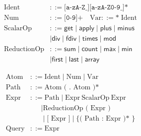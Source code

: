 \documentclass[runningheads]{llncs}
\begin{document}
\begin{figure}[t!]
\scriptsize

\begin{minipage}{0.5\textwidth}
\begin{align*}
\text{Ident} &::= \texttt{[a-zA-Z\_][a-zA-Z0-9\_]*} \\
\text{Num} & ::= \texttt{[0-9]+} \quad \text{Var} ::= \texttt{*}\;\text{Ident} \\
\text{ScalarOp} &::= \textsf{get} \mid \textsf{apply} \mid \textsf{plus} \mid \textsf{minus} \\ 
&\mid \textsf{div} \mid \textsf{fdiv} \mid \textsf{times} \mid \textsf{mod} \\ 
\text{ReductionOp} &::= \textsf{sum} \mid \textsf{count} \mid \textsf{max} \mid \textsf{min} \\ 
&\mid \textsf{first} \mid \textsf{last} \mid \textsf{array}
\end{align*}
\end{minipage}%
\begin{minipage}{0.5\textwidth}
\begin{align*}
\text{Atom} &::= \text{Ident} \mid \text{Num} \mid \text{Var} \\
\text{Path} &::= \text{Atom ( . Atom )*} \\
\text{Expr} &::= \text{Path} \mid \text{Expr} \ \text{ScalarOp} \ \text{Expr} \\
&\quad\;\; \mid \text{ReductionOp ( Expr )} \\
&\quad\;\; \mid \text{[ Expr ]} \mid \text{\{ ( Path : Expr )* \}} \\
\text{Query} &::= \text{Expr}
\end{align*}
\end{minipage}


\end{figure}
\end{document}
